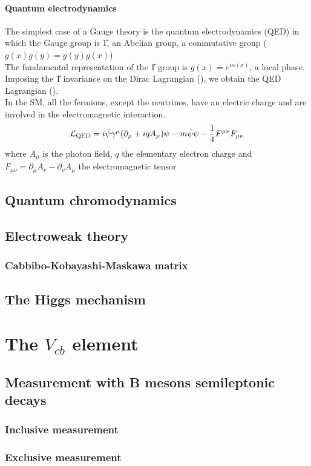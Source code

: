 \paragraph*{Quantum electrodynamics}
The simplest case of a Gauge theory is the quantum electrodynamics (QED) in which the Gauge group is \U{1}, an Abelian group, \ie a commutative group ($g(x)g(y)=g(y)g(x)$)\\
The fundamental representation of the \U{1} group is $g(x)=e^{i \alpha(x)}$, \ie a local phase.\\
Imposing the \U{1} invariance on the Dirac Lagrangian (), we obtain the QED Lagrangian ().\\
In the SM, all the fermions, except the neutrinos, have an electric charge and are involved in the electromagnetic interaction.
\begin{equation}\label{eq:QED}
    \mathcal{L}_\text{QED}=i\bar{\psi}\gamma^{\mu}(\partial_{\mu}+i q A_{\mu})\psi-m\bar{\psi}\psi-\frac{1}{4}F^{\mu\nu}F_{\mu\nu}
\end{equation}
where $A_\mu$ is the photon field, $q$ the elementary electron charge and $F_{\mu\nu}=\partial_\mu A_\nu-\partial_\nu A_\mu$ the electromagnetic tensor \\


\subsection{Quantum chromodynamics}

\subsection{Electroweak theory}

\subsubsection*{Cabbibo-Kobayashi-Maskawa matrix}

\subsection{The Higgs mechanism}

\section{The $V_{cb}$ element}

\subsection{Measurement with B mesons semileptonic decays}

\subsubsection*{Inclusive measurement}

\subsubsection*{Exclusive measurement}
